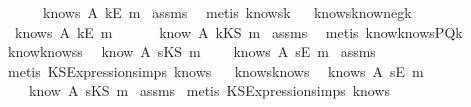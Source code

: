\begin{isabellebody}
\ \ \ \ \ {\isachardoublequoteopen}{\isasymnot}\ knows\ A\ {\isacharbrackleft}kE\ m{\isacharbrackright}{\isachardoublequoteclose}\isanewline
%
\isadelimproof
%
\endisadelimproof
%
\isatagproof
{}\isamarkupfalse%
\ assms\ \isamarkupfalse%
\ {\isacharparenleft}metis\ knows{}k{\isacharparenright}%
\endisatagproof
{\isafoldproof}%
%
\isadelimproof
\ \isanewline
%
\endisadelimproof
\isanewline
{}\isamarkupfalse%
\ knows{}know{\isacharunderscore}neg{\isacharunderscore}k{\isacharcolon}\ \isanewline
{}\ {\isachardoublequoteopen}{\isasymnot}\ knows\ A\ {\isacharbrackleft}kE\ m{\isacharbrackright}{\isachardoublequoteclose}\ \isanewline
{}\ \ \ \ {\isachardoublequoteopen}{\isasymnot}\ know\ A\ {\isacharparenleft}kKS\ m{\isacharparenright}{\isachardoublequoteclose}\isanewline
%
\isadelimproof
%
\endisadelimproof
%
\isatagproof
{}\isamarkupfalse%
\ assms\ \isamarkupfalse%
\ {\isacharparenleft}metis\ know{}knowsPQ{\isacharunderscore}k{\isacharparenright}%
\endisatagproof
{\isafoldproof}%
%
\isadelimproof
\isanewline
%
\endisadelimproof
\isanewline
{}\isamarkupfalse%
\ know{}knows{\isacharunderscore}s{\isacharcolon}\ \isanewline
{}\ {\isachardoublequoteopen}know\ A\ {\isacharparenleft}sKS\ m{\isacharparenright}{\isachardoublequoteclose}\isanewline
{}\ \ \ \ {\isachardoublequoteopen}knows\ A\ {\isacharbrackleft}sE\ m{\isacharbrackright}{\isachardoublequoteclose}\isanewline
%
\isadelimproof
%
\endisadelimproof
%
\isatagproof
{}\isamarkupfalse%
\ assms\isanewline
{}\isamarkupfalse%
\ {\isacharparenleft}metis\ KS{}Expression{\isachardot}simps{\isacharparenleft}{}{\isacharparenright}\ know{}s{\isacharparenright}%
\endisatagproof
{\isafoldproof}%
%
\isadelimproof
\ \isanewline
%
\endisadelimproof
\isanewline
{}\isamarkupfalse%
\ knows{}know{\isacharunderscore}s{\isacharcolon}\ \isanewline
{}\ {\isachardoublequoteopen}knows\ A\ {\isacharbrackleft}sE\ m{\isacharbrackright}{\isachardoublequoteclose}\ \isanewline
{}\ \ \ \ {\isachardoublequoteopen}know\ A\ {\isacharparenleft}sKS\ m{\isacharparenright}{\isachardoublequoteclose}\isanewline
%
\isadelimproof
%
\endisadelimproof
%
\isatagproof
{}\isamarkupfalse%
\ assms\isanewline
{}\isamarkupfalse%
\ {\isacharparenleft}metis\ KS{}Expression{\isachardot}simps{\isacharparenleft}{}{\isacharparenright}\ know{}s{\isacharparenright}%

\end{isabellebody}
